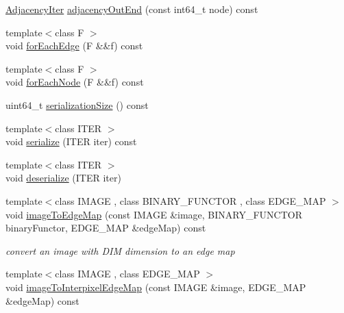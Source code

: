 \begin{DoxyCompactItemize}
\item 
\hyperlink{classnifty_1_1graph_1_1UndirectedGridGraph_3_01DIM_00_01true_01_4_a9779969eb8762908d43eab3d9d3b17b1}{Adjacency\+Iter} \hyperlink{classnifty_1_1graph_1_1UndirectedGridGraph_3_01DIM_00_01true_01_4_ae218026819274385a02b25b427b061fe}{adjacency\+Out\+End} (const int64\+\_\+t node) const 
\item 
{\footnotesize template$<$class F $>$ }\\void \hyperlink{classnifty_1_1graph_1_1UndirectedGridGraph_3_01DIM_00_01true_01_4_abc96c4bde9f5a06e0f9790362d8217b4}{for\+Each\+Edge} (F \&\&f) const 
\item 
{\footnotesize template$<$class F $>$ }\\void \hyperlink{classnifty_1_1graph_1_1UndirectedGridGraph_3_01DIM_00_01true_01_4_ac2da273d8721f71f46b3083d3ad25803}{for\+Each\+Node} (F \&\&f) const 
\item 
uint64\+\_\+t \hyperlink{classnifty_1_1graph_1_1UndirectedGridGraph_3_01DIM_00_01true_01_4_a6f7fc48b84039c3db37a1deac2d1f838}{serialization\+Size} () const 
\item 
{\footnotesize template$<$class I\+T\+E\+R $>$ }\\void \hyperlink{classnifty_1_1graph_1_1UndirectedGridGraph_3_01DIM_00_01true_01_4_aba7a207a92ef6c7912f714672c3da7df}{serialize} (I\+T\+E\+R iter) const 
\item 
{\footnotesize template$<$class I\+T\+E\+R $>$ }\\void \hyperlink{classnifty_1_1graph_1_1UndirectedGridGraph_3_01DIM_00_01true_01_4_a0b1e57a51d603060ce799156851146cd}{deserialize} (I\+T\+E\+R iter)
\item 
{\footnotesize template$<$class I\+M\+A\+G\+E , class B\+I\+N\+A\+R\+Y\+\_\+\+F\+U\+N\+C\+T\+O\+R , class E\+D\+G\+E\+\_\+\+M\+A\+P $>$ }\\void \hyperlink{classnifty_1_1graph_1_1UndirectedGridGraph_3_01DIM_00_01true_01_4_a0d92ce1eff687c1bc5b8f3cc5492a4f4}{image\+To\+Edge\+Map} (const I\+M\+A\+G\+E \&image, B\+I\+N\+A\+R\+Y\+\_\+\+F\+U\+N\+C\+T\+O\+R binary\+Functor, E\+D\+G\+E\+\_\+\+M\+A\+P \&edge\+Map) const 
\begin{DoxyCompactList}\small\item\em convert an image with D\+I\+M dimension to an edge map \end{DoxyCompactList}\item 
{\footnotesize template$<$class I\+M\+A\+G\+E , class E\+D\+G\+E\+\_\+\+M\+A\+P $>$ }\\void \hyperlink{classnifty_1_1graph_1_1UndirectedGridGraph_3_01DIM_00_01true_01_4_a95b69aed23ee5d82e7d8a23abd625fea}{image\+To\+Interpixel\+Edge\+Map} (const I\+M\+A\+G\+E \&image, E\+D\+G\+E\+\_\+\+M\+A\+P \&edge\+Map) const 

\end{DoxyCompactItemize}
